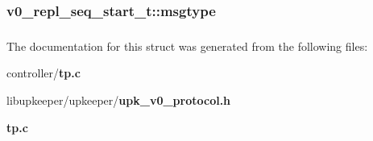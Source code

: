 \subsubsection[{msgtype}]{ {\bf v0\_\-repl\_\-seq\_\-start\_\-t::msgtype}}\label{structv0__repl__seq__start__t_aeca2ea1d92026fb46a2e6d0b2f23c918}
\subsubsection[{UPK\_\-V0\_\-UPK\_\-REPL\_\-SEQ\_\-START\_\-T\_\-FIELDS}]{}\label{structv0__repl__seq__start__t_a187d1a3a9c4099ea2254f8a8c629fb2b}


The documentation for this struct was generated from the following files:\begin{DoxyCompactItemize}
\item 
controller/{\bf tp.c}\item 
libupkeeper/upkeeper/{\bf upk\_\-v0\_\-protocol.h}\item 
{\bf tp.c}\end{DoxyCompactItemize}
